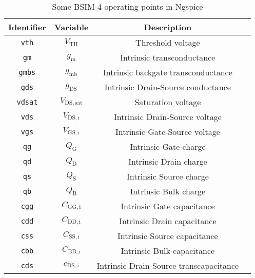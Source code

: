 \documentclass{article}[11pt]
\begin{document}
\begin{table}[H]
\centering
\caption{Some BSIM-4 operating points in Ngspice}
\begin{tabular}{cccl}
\toprule
\textbf{Identifier}  & \textbf{Variable}      & \textbf{Description}                                   \\ \midrule
\texttt{vth}         & $V_{\mathrm{TH}}$      & Threshold voltage                                      \\ 
\texttt{gm}          & $g_{\mathrm{m}}$       & Intrinsic transconductance                             \\ 
\texttt{gmbs}        & $g_{\mathrm{mb}}$      & Intrinsic backgate transconductance                    \\ 
\texttt{gds}         & $g_{\mathrm{DS}}$      & Intrinsic Drain-Source conductance                     \\ 
\texttt{vdsat}       & $V_{\mathrm{DS,sat}}$  & Saturation voltage                                     \\ 
\texttt{vds}         & $V_{\mathrm{DS,i}}$    & Intrinsic Drain-Source voltage                         \\ 
\texttt{vgs}         & $V_{\mathrm{GS,i}}$    & Intrinsic Gate-Source voltage                          \\ 
\texttt{qg}          & $Q_{\mathrm{G}}$       & Intrinsic Gate charge                                  \\ 
\texttt{qd}          & $Q_{\mathrm{D}}$       & Intrinsic Drain charge                                 \\ 
\texttt{qs}          & $Q_{\mathrm{S}}$       & Intrinsic Source charge                                \\ 
\texttt{qb}          & $Q_{\mathrm{B}}$       & Intrinsic Bulk charge                                  \\ 
\texttt{cgg}         & $C_{\mathrm{GG,i}}$    & Intrinsic Gate capacitance                             \\ 
\texttt{cdd}         & $C_{\mathrm{DD,i}}$    & Intrinsic Drain capacitance                            \\ 
\texttt{css}         & $C_{\mathrm{SS,i}}$    & Intrinsic Source capacitance                           \\ 
\texttt{cbb}         & $C_{\mathrm{BB,i}}$    & Intrinsic Bulk capacitance                             \\ 
\texttt{cds}         & $c_{\mathrm{DS,i}}$    & Intrinsic Drain-Source transcapacitance                \\ 

\end{tabular}
\end{table}
\end{document}
